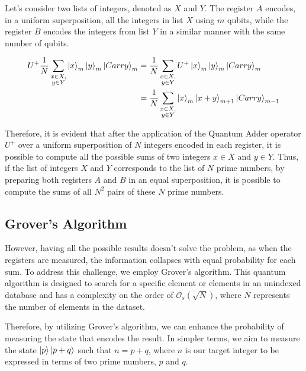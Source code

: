 \documentclass[12pt, a4paper]{article}
\begin{document}
\begin{figure}
        \label{fig:QuantumAdder}
    \end{figure}
    
    Let's consider two lists of integers, denoted as $X$ and $Y$. The register $A$ encodes, in a uniform superposition, all the integers in list $X$ using $m$ qubits, while the register $B$ encodes the integers from list $Y$ in a similar manner with the same number of qubits.

    \begin{equation}
        \begin{aligned}
            U^+ \frac 1N\sum_{\substack {x\in X,\\y\in Y}} \ket{x}_m  \ket{y}_m  \ket{Carry}_m &= \frac 1N \sum_{\substack {x\in X,\\y\in Y}} U^+ \ket{x}_m\ket{y}_m\ket{Carry}_m\\
            &= \frac 1N \sum_{\substack {x\in X,\\y\in Y}} \ket{x}_m\ket{x+y}_{m+1}\ket{Carry}_{m-1}
        \end{aligned}
    \end{equation}

    Therefore, it is evident that after the application of the Quantum Adder operator $U^+$ over a uniform superposition of $N$ integers encoded in each register, it is possible to compute all the possible sums of two integers $x\in X$ and $y \in Y$. Thus, if the list of integers $X$ and $Y$ corresponds to the list of $N$ prime numbers, by preparing both registers $A$ and $B$ in an equal superposition, it is possible to compute the sums of all $N^2$ pairs of these $N$ prime numbers.

    \subsection{Grover's Algorithm}

    However, having all the possible results doesn't solve the problem, as when the registers are measured, the information collapses with equal probability for each sum. To address this challenge, we employ Grover's algorithm. This quantum algorithm is designed to search for a specific element or elements in an unindexed database and has a complexity on the order of $\mathcal{O}_s(\sqrt{N})$, where $N$ represents the number of elements in the dataset.

    Therefore, by utilizing Grover's algorithm, we can enhance the probability of measuring the state that encodes the result. In simpler terms, we aim to measure the state $\ket{p}\ket{p+q}$ such that $n = p+q$, where $n$ is our target integer to be expressed in terms of two prime numbers, $p$ and $q$.
\end{document}

